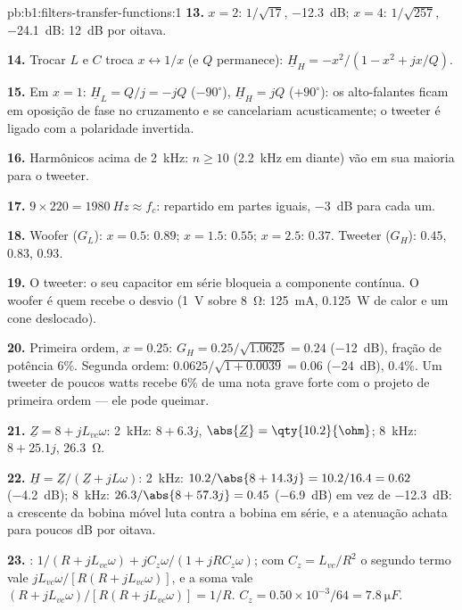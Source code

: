\begin{solution}{pb:b1:filters-transfer-functions:1}
\textbf{13.} $x = 2$: $1/\sqrt{17}$, \qty{-12.3}{dB}; $x = 4$: $1/\sqrt{257}$,
\qty{-24.1}{dB}: \qty{12}{dB} por oitava.

\textbf{14.} Trocar $L$ e $C$ troca $x \leftrightarrow 1/x$ (e
$Q$ permanece): $\underline H_H = -x^2/(1 - x^2 + jx/Q)$.

\textbf{15.} Em $x = 1$: $\underline H_L = Q/j = -jQ$ ($-90^\circ$),
$\underline H_H = jQ$ ($+90^\circ$): os alto-falantes ficam em oposição
de fase no cruzamento e se cancelariam acusticamente; o tweeter
é ligado com a polaridade invertida.

\textbf{16.} Harmônicos acima de \qty{2}{kHz}: $n \geq 10$ (\qty{2.2}{kHz}
em diante) vão em sua maioria para o tweeter.

\textbf{17.} $9 \times 220 = \qty{1980}{Hz} \approx f_c$: repartido em partes iguais,
\qty{-3}{dB} para cada um.

\textbf{18.} Woofer ($G_L$): $x = 0.5$: $0.89$; $x = 1.5$: $0.55$; $x = 2.5$:
$0.37$. Tweeter ($G_H$): $0.45$, $0.83$, $0.93$.

\textbf{19.} O tweeter: o seu capacitor em série bloqueia a componente contínua. O woofer
é quem recebe o desvio (\qty{1}{V} sobre \qty{8}{\ohm}: \qty{125}{mA},
\qty{0.125}{W} de calor e um cone deslocado).

\textbf{20.} Primeira ordem, $x = 0.25$: $G_H = 0.25/\sqrt{1.0625} = 0.24$
(\qty{-12}{dB}), fração de potência $6\%$. Segunda ordem: $0.0625/\sqrt{1 +
0.0039} = 0.06$ (\qty{-24}{dB}), $0.4\%$. Um tweeter de poucos watts
recebe $6\%$ de uma nota grave forte com o projeto de primeira ordem --- ele pode
queimar.

\textbf{21.} $\underline Z = 8 + jL_{vc}\omega$: \qty{2}{kHz}: $8 + 6.3j$,
$\abs{\underline Z} = \qty{10.2}{\ohm}$; \qty{8}{kHz}: $8 + 25.1j$,
\qty{26.3}{\ohm}.

\textbf{22.} $\underline H = \underline Z/(\underline Z + jL\omega)$:
\qty{2}{kHz}: $10.2/\abs{8 + 14.3j} = 10.2/16.4 = 0.62$ (\qty{-4.2}{dB});
\qty{8}{kHz}: $26.3/\abs{8 + 57.3j} = 0.45$ (\qty{-6.9}{dB}) em vez de
\qty{-12.3}{dB}: a  crescente da bobina móvel luta contra a bobina em série, e
a atenuação achata para poucos dB por oitava.

\textbf{23.} : $1/(R + jL_{vc}\omega) + jC_z\omega/(1 + jRC_z\omega)$;
com $C_z = L_{vc}/R^2$ o segundo termo vale $jL_{vc}\omega/[R(R +
jL_{vc}\omega)]$, e a soma vale $(R + jL_{vc}\omega)/[R(R + jL_{vc}\omega)]
= 1/R$. $C_z = 0.50\times10^{-3}/64 = \qty{7.8}{\micro F}$.


\end{solution}
